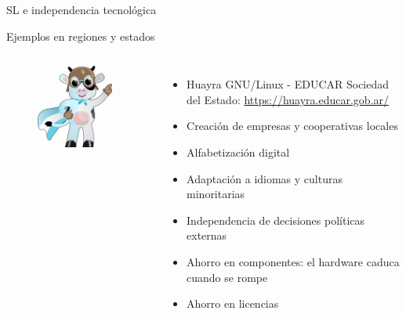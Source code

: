 \documentclass{beamer}
\begin{document}
\begin{frame}{SL e independencia tecnológica}
  \begin{exampleblock}{Ejemplos en regiones y estados}
  \end{exampleblock}
  
  \begin{columns}
    \begin{figure}
      \centering
      \includegraphics[width=0.9\textwidth]{pics/huayra-vaca.png}
    \end{figure}

    \pause
    \begin{itemize}[<+->]
    \item Huayra GNU/Linux - EDUCAR Sociedad del Estado: \href{https://huayra.educar.gob.ar/}{https://huayra.educar.gob.ar/}
    \item Creación de empresas y cooperativas locales
    \item Alfabetización digital
    \item Adaptación a idiomas y culturas minoritarias
    \item Independencia de decisiones políticas externas
    \item Ahorro en componentes: el hardware caduca cuando se rompe%
    \item Ahorro en licencias 
    \end{itemize}   \end{columns}
\end{frame}
\end{document}
